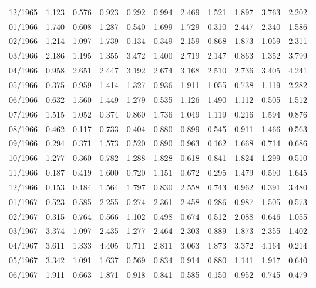 \begin{tabular}{lrrrrrrrrrr}
12/1965 &  1.123 &  0.576 &  0.923 &  0.292 &  0.994 &  2.469 &  1.521 &  1.897 &  3.763 &  2.202 \\
01/1966 &  1.740 &  0.608 &  1.287 &  0.540 &  1.699 &  1.729 &  0.310 &  2.447 &  2.340 &  1.586 \\
02/1966 &  1.214 &  1.097 &  1.739 &  0.134 &  0.349 &  2.159 &  0.868 &  1.873 &  1.059 &  2.311 \\
03/1966 &  2.186 &  1.195 &  1.355 &  3.472 &  1.400 &  2.719 &  2.147 &  0.863 &  1.352 &  3.799 \\
04/1966 &  0.958 &  2.651 &  2.447 &  3.192 &  2.674 &  3.168 &  2.510 &  2.736 &  3.405 &  4.241 \\
05/1966 &  0.375 &  0.959 &  1.414 &  1.327 &  0.936 &  1.911 &  1.055 &  0.738 &  1.119 &  2.282 \\
06/1966 &  0.632 &  1.560 &  1.449 &  1.279 &  0.535 &  1.126 &  1.490 &  1.112 &  0.505 &  1.512 \\
07/1966 &  1.515 &  1.052 &  0.374 &  0.860 &  1.736 &  1.049 &  1.119 &  0.216 &  1.594 &  0.876 \\
08/1966 &  0.462 &  0.117 &  0.733 &  0.404 &  0.880 &  0.899 &  0.545 &  0.911 &  1.466 &  0.563 \\
09/1966 &  0.294 &  0.371 &  1.573 &  0.520 &  0.890 &  0.963 &  0.162 &  1.668 &  0.714 &  0.686 \\
10/1966 &  1.277 &  0.360 &  0.782 &  1.288 &  1.828 &  0.618 &  0.841 &  1.824 &  1.299 &  0.510 \\
11/1966 &  0.187 &  0.419 &  1.600 &  0.720 &  1.151 &  0.672 &  0.295 &  1.479 &  0.590 &  1.645 \\
12/1966 &  0.153 &  0.184 &  1.564 &  1.797 &  0.830 &  2.558 &  0.743 &  0.962 &  0.391 &  3.480 \\
01/1967 &  0.523 &  0.585 &  2.255 &  0.274 &  2.361 &  2.458 &  0.286 &  0.987 &  1.505 &  0.573 \\
02/1967 &  0.315 &  0.764 &  0.566 &  1.102 &  0.498 &  0.674 &  0.512 &  2.088 &  0.646 &  1.055 \\
03/1967 &  3.374 &  1.097 &  2.435 &  1.277 &  2.464 &  2.303 &  0.889 &  1.873 &  2.355 &  1.402 \\
04/1967 &  3.611 &  1.333 &  4.405 &  0.711 &  2.811 &  3.063 &  1.873 &  3.372 &  4.164 &  0.214 \\
05/1967 &  3.342 &  1.091 &  1.637 &  0.569 &  0.834 &  0.914 &  0.880 &  1.141 &  1.917 &  0.640 \\
06/1967 &  1.911 &  0.663 &  1.871 &  0.918 &  0.841 &  0.585 &  0.150 &  0.952 &  0.745 &  0.479 \\

\end{tabular}
